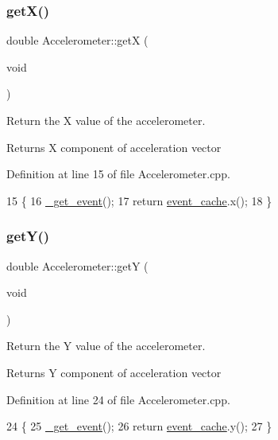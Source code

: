 \subsubsection{\texorpdfstring{get\+X()}{getX()}}
{\footnotesize\ttfamily double Accelerometer\+::getX (\begin{DoxyParamCaption}\item[{void}]{ }\end{DoxyParamCaption})}



Return the X value of the accelerometer. 

\begin{DoxyReturn}{Returns}
X component of acceleration vector 
\end{DoxyReturn}


Definition at line 15 of file Accelerometer.\+cpp.


\begin{DoxyCode}
15                                \{
16     \hyperlink{class_accelerometer_a0a5be85959063e5bc2092668b59b9b97}{\_get\_event}();
17     \textcolor{keywordflow}{return} \hyperlink{class_accelerometer_a179b04d61746127f9264ce87ba6e20ce}{event\_cache}.x();
18 \}
\end{DoxyCode}
\mbox{\label{class_accelerometer_aba32b3d5b8a7c7f4e257f53551813b32}} 
\subsubsection{\texorpdfstring{get\+Y()}{getY()}}
{\footnotesize\ttfamily double Accelerometer\+::getY (\begin{DoxyParamCaption}\item[{void}]{ }\end{DoxyParamCaption})}



Return the Y value of the accelerometer. 

\begin{DoxyReturn}{Returns}
Y component of acceleration vector 
\end{DoxyReturn}


Definition at line 24 of file Accelerometer.\+cpp.


\begin{DoxyCode}
24                                \{
25     \hyperlink{class_accelerometer_a0a5be85959063e5bc2092668b59b9b97}{\_get\_event}();
26     \textcolor{keywordflow}{return} \hyperlink{class_accelerometer_a179b04d61746127f9264ce87ba6e20ce}{event\_cache}.y();
27 \}
\end{DoxyCode}
\mbox{\label{class_accelerometer_a3d363ae0b29b5f17aff4b72f7a2b6a0d}} 
